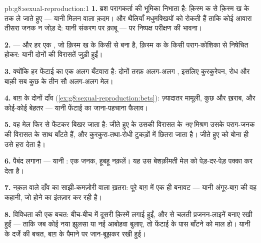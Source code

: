 \begin{solution}{pb:g8:sexual-reproduction:1}
\textbf{1.} ब्रश परागकर्ता की भूमिका निभाता है:   क़िस्म क से
क़िस्म ख के  तक ले जाते हुए --- यानी मिलन वाला क़दम। और
थैलियाँ मधुमक्खियों को रोकती हैं ताकि कोई आवारा  तीसरा जनक न जोड़
दे: यानी संकरण पर क़ाबू ---  पर निष्पक्ष परीक्षण की भावना।

\textbf{2.}  --- और हर  एक , जो क़िस्म ख के किसी  से
बना है, क़िस्म क के किसी पराग-कोशिका से निषेचित होकर: यानी दोनों की
विरासतें जुड़ी हुईं।

\textbf{3.} क्योंकि हर  फेंटाई का एक अलग बँटवारा है: दोनों तरफ़
अलग-अलग , इसलिए कुरकुरेपन, रोध और बाक़ी सब कुछ के तीन सौ अलग-अलग
मेल।

\textbf{4.} बाग़ के दोनों दाँव
(\cref{ex:g8:sexual-reproduction:bets}): ज़्यादातर  मामूली, कुछ
और ख़राब, और कोई-कोई बेहतर --- यानी फेंटाई का जाना-पहचाना फैलाव।

\textbf{5.} वह मेल फिर से फेंटकर बिखर जाता है: जीते हुए  के 
उसकी विरासत के \emph{नए} मिश्रण उसके पराग-जनक की विरासत के साथ बाँटते
हैं, और कुरकुरा-तथा-रोधी टुकड़ों में छितरा जाता है। जीते हुए को बोना ही
उसे हरा देता है।

\textbf{6.} पैबंद लगाना --- यानी : एक जनक, हूबहू नक़लें। यह उस
बेशक़ीमती मेल को पेड़-दर-पेड़ पक्का कर देता है।

\textbf{7.} नक़ल वाले दाँव का साझी-कमज़ोरी वाला ख़तरा: पूरे बाग़ में एक
ही बनावट --- यानी अंगूर-बाग़ की वह कहानी, जो होने का इंतज़ार कर रही है।

\textbf{8.} विविधता की एक बचत: बीच-बीच में दूसरी क़िस्में लगाई हुईं, और
 से चलती प्रजनन-लाइनें बनाए रखी हुईं --- ताकि जब कोई नया झुलसा या नई
आबोहवा बुलाए, तो फेंटाई के पास बाँटने को माल हो। यानी  के दर्जे
की बचत, बाग़ के पैमाने पर जान-बूझकर रखी हुई।


\end{solution}
